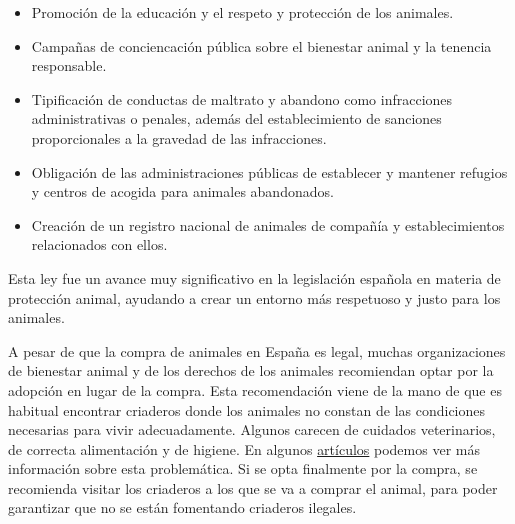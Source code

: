 \documentclass[a4paper, 12pt]{article}
\begin{document}
\begin{itemize}
	\begin{itemize}
	\item Promoción de la educación y el respeto y protección de los animales.
	\item Campañas de conciencación pública sobre el bienestar animal y la tenencia responsable.
	\item Tipificación de conductas de maltrato y abandono como infracciones administrativas o penales, además del establecimiento de sanciones proporcionales a la gravedad de las infracciones.
	\item Obligación de las administraciones públicas de establecer y mantener refugios y centros de acogida para animales abandonados.
	\item Creación de un registro nacional de animales de compañía y establecimientos relacionados con ellos.
	\end{itemize}
\end{itemize}

Esta ley fue un avance muy significativo en la legislación española en materia de protección animal, ayudando a crear un entorno más respetuoso y justo para los animales. 

A pesar de que la compra de animales en España es legal, muchas organizaciones de bienestar animal y de los derechos de los animales recomiendan optar por la adopción en lugar de la compra. Esta recomendación viene de la mano de que  es habitual encontrar criaderos donde los animales no constan de las condiciones necesarias para vivir adecuadamente. Algunos carecen de cuidados veterinarios, de correcta alimentación y de higiene. En algunos \href{https://investigaciones.petalatino.com/animales-sufren-comercio-mascotas/}{artículos} podemos ver más información sobre esta problemática. Si se opta finalmente por la compra, se recomienda visitar los criaderos a los que se va a comprar el animal, para poder garantizar que no se están fomentando criaderos ilegales. 
\end{document}
